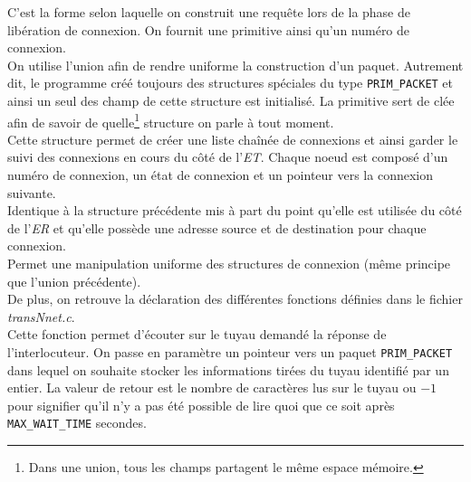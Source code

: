 \documentclass[11pt,french]{article}
\begin{document}
            
            C'est la forme selon laquelle on construit une requête lors de la phase de libération de connexion. On fournit une primitive ainsi qu'un 
            numéro de connexion.\\

            
            On utilise l'union afin de rendre uniforme la construction d'un paquet. Autrement dit, le programme créé toujours des structures spéciales 
            du type \texttt{PRIM\_PACKET} et ainsi un seul des champ de cette structure est initialisé. La primitive sert de clée afin de savoir de
            quelle\footnote{Dans une union, tous les champs partagent le même espace mémoire.} structure on parle à tout moment.\\

            
            Cette structure permet de créer une liste chaînée de connexions et ainsi garder le suivi des connexions en cours du côté de l'\emph{ET}. 
            Chaque noeud est composé d'un numéro de connexion, un état de connexion et un pointeur vers la connexion suivante.\\

            
            Identique à la structure précédente mis à part du point qu'elle est utilisée du côté de l'\emph{ER} et qu'elle possède une adresse source et
            de destination pour chaque connexion.\\

            
            Permet une manipulation uniforme des structures de connexion (même principe que l'union précédente).\\

            De plus, on retrouve la déclaration des différentes fonctions définies dans le fichier \emph{transNnet.c}.\\

            
            Cette fonction permet d'écouter sur le tuyau demandé la réponse de l'interlocuteur. On passe en paramètre un pointeur vers un paquet 
            \texttt{PRIM\_PACKET} dans lequel on souhaite stocker les informations tirées du tuyau identifié par un entier. La valeur de retour
            est le nombre de caractères lus sur le tuyau ou $-1$ pour signifier qu'il n'y a pas été possible de lire quoi que ce soit après 
            \texttt{MAX\_WAIT\_TIME} secondes.\\
\end{document}
